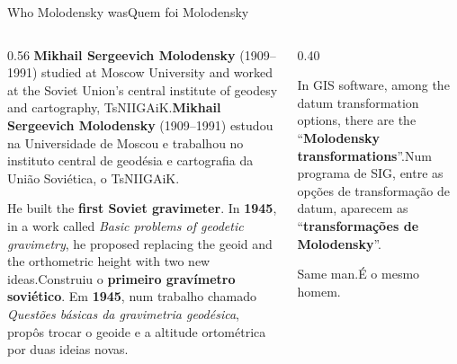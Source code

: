 \documentclass[aspectratio=169,11pt]{beamer}
\newcommand{\tr}[2]{\ifEN#2\else#1\fi}
\newcommand{\bnum}[1]{\textbf{\textcolor{mTeal}{#1}}}
\begin{document}
\begin{frame}{\tr{Quem foi Molodensky}{Who Molodensky was}}
  \begin{columns}[T]
    \begin{column}{0.56\textwidth}
      \tr{\textbf{Mikhail Sergeevich Molodensky} (1909--1991) estudou na Universidade de
      Moscou e trabalhou no instituto central de geodésia e cartografia da União Soviética, o
      TsNIIGAiK.}{\textbf{Mikhail Sergeevich Molodensky} (1909--1991) studied at Moscow
      University and worked at the Soviet Union's central institute of geodesy and
      cartography, TsNIIGAiK.}
      \medskip

      \tr{Construiu o \bnum{primeiro gravímetro soviético}. Em \bnum{1945}, num trabalho chamado
      \emph{Questões básicas da gravimetria geodésica}, propôs trocar o geoide e a altitude
      ortométrica por duas ideias novas.}{He built the \bnum{first Soviet gravimeter}. In
      \bnum{1945}, in a work called \emph{Basic problems of geodetic gravimetry}, he proposed
      replacing the geoid and the orthometric height with two new ideas.}
    \end{column}
    \begin{column}{0.40\textwidth}
      \begin{ideia}[title={\tr{Você talvez já tenha visto o nome}{You may have seen the name}}]
        \small\raggedright\tr{Num programa de SIG, entre as opções de transformação de datum, aparecem as
        ``\bnum{transformações de Molodensky}''.}{In GIS software, among the datum
        transformation options, there are the ``\bnum{Molodensky transformations}''.}
        \medskip

        \tr{É o mesmo homem.}{Same man.}
      \end{ideia}
    \end{column}
  \end{columns}
\end{frame}
\end{document}
